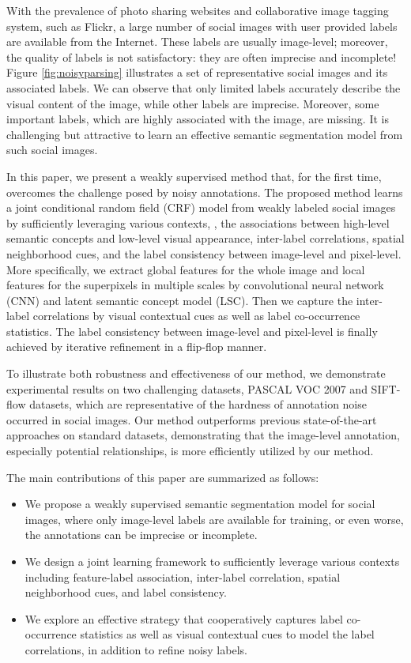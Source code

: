 With the prevalence of photo sharing websites and collaborative image tagging system, such as Flickr, a large number of social images with user provided labels are available from the Internet.
These labels are usually image-level; moreover, the quality of labels is not satisfactory: they are often imprecise and incomplete!
Figure \ref{fig:noisyparsing} illustrates a set of representative social images and its associated labels.
We can observe that only limited labels accurately describe the visual content of the image, while other labels are imprecise.
Moreover, some important labels, which are highly associated with the image, are missing.
It is challenging but attractive to learn an effective semantic segmentation model from such social images.

In this paper, we present a weakly supervised method that, for the first time, overcomes the challenge posed by noisy annotations.
The proposed method learns a joint conditional random field (CRF) model from weakly labeled social images by sufficiently leveraging various contexts, \eg, the associations between high-level semantic concepts and low-level visual appearance, inter-label correlations, spatial neighborhood cues, and the label consistency between image-level and pixel-level.
More specifically, we extract global features for the whole image and local features for the superpixels in multiple scales by convolutional neural network (CNN) and latent semantic concept model (LSC).
Then we capture the inter-label correlations by visual contextual cues as well as label co-occurrence statistics.
The label consistency between image-level and pixel-level is finally achieved by iterative refinement in a flip-flop manner.

To illustrate both robustness and effectiveness of our method, we demonstrate experimental results on two challenging datasets, PASCAL VOC 2007 and SIFT-flow datasets, which are representative of the hardness of annotation noise occurred in social images.
Our method outperforms previous state-of-the-art approaches on standard datasets, demonstrating that the image-level annotation, especially potential relationships, is more efficiently utilized by our method.

The main contributions of this paper are summarized as follows:
\begin{itemize}
  \item We propose a weakly supervised semantic segmentation model for social images, where only image-level labels are available for training, or even worse, the annotations can be imprecise or incomplete.
  \item We design a joint learning framework to sufficiently leverage various contexts including feature-label association, inter-label correlation,  spatial neighborhood cues, and label consistency.
  \item We explore an effective strategy that cooperatively captures label co-occurrence statistics as well as visual contextual cues to model the label correlations, in addition to refine noisy labels.
\end{itemize}
